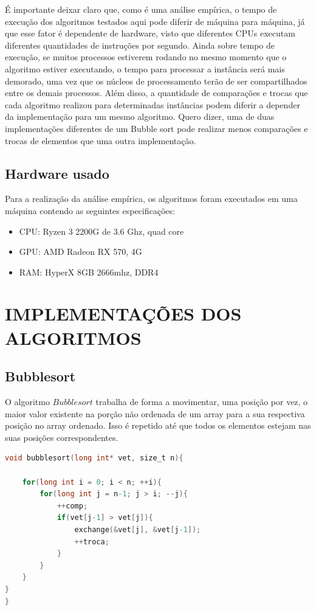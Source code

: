 \documentclass[report]{uftex}
\begin{document}
É importante deixar claro que, como é uma análise empírica, o tempo de execução dos algoritmos testados aqui pode diferir de máquina para máquina, já que esse fator é dependente de hardware, visto que diferentes CPUs executam diferentes quantidades de instruções por segundo. Ainda sobre tempo de execução, se muitos processos estiverem rodando no mesmo momento que o algoritmo estiver executando, o tempo para processar a instância será mais demorado, uma vez que os núcleos de processamento terão de ser compartilhados entre os demais processos. Além disso, a quantidade de comparações e trocas que cada algoritmo realizou para determinadas instâncias podem diferir a depender da implementação para um mesmo algoritmo. Quero dizer, uma de duas implementações diferentes de um Bubble sort pode realizar menos comparações e trocas de elementos que uma outra implementação.


\section{Hardware usado}
Para a realização da análise empírica, os algoritmos foram executados em uma máquina contendo as seguintes especificações:
\begin{itemize}
    \item CPU: Ryzen 3 2200G de 3.6 Ghz, quad core
    \item GPU: AMD Radeon RX 570, 4G
    \item RAM: HyperX 8GB 2666mhz, DDR4
\end{itemize}


\chapter{IMPLEMENTAÇÕES DOS ALGORITMOS}

\section{Bubblesort}
O algoritmo $Bubblesort$ trabalha de forma a movimentar, uma posição por vez, o maior valor existente na porção não ordenada de um array para a sua respectiva posição no array ordenado. Isso é repetido até que todos os elementos estejam nas suas posições correspondentes.\\

\begin{lstlisting}[language=C]
void bubblesort(long int* vet, size_t n){

    for(long int i = 0; i < n; ++i){
        for(long int j = n-1; j > i; --j){
            ++comp;
            if(vet[j-1] > vet[j]){
                exchange(&vet[j], &vet[j-1]);
                ++troca;
            }
        }
    }
}
}
\end{lstlisting}
\end{document}

